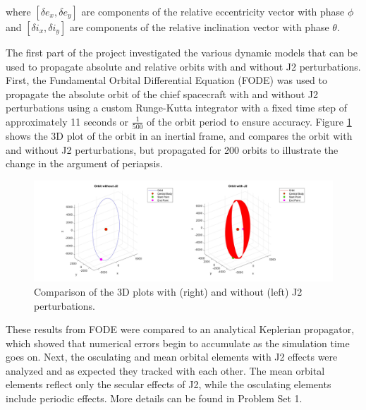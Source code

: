 where $[\delta e_x, \delta e_y]$ are components of the relative eccentricity vector with phase $\phi$ and $[\delta i_x, \delta i_y]$ are components of the relative inclination vector with phase $\theta$.

The first part of the project investigated the various dynamic models that can be used to propagate absolute and relative orbits with and without J2 perturbations. First, the Fundamental Orbital Differential Equation (FODE) was used to propagate the absolute orbit of the chief spacecraft with and without J2 perturbations using a custom Runge-Kutta integrator with a fixed time step of approximately 11 seconds or $\frac{1}{500}$ of the orbit period to ensure accuracy. Figure \ref{fig:3d_plots_with_j2} shows the 3D plot of the orbit in an inertial frame, and compares the orbit with and without J2 perturbations, but propagated for 200 orbits to illustrate the change in the argument of periapsis. 

\begin{figure}[H]
    \centering
    \includegraphics[width=1.1\linewidth]{PS1/Figures/Orbit_J2_Comparison_ECI.jpg}
    \caption{Comparison of the 3D plots with (right) and without (left) J2 perturbations. }
    \label{fig:3d_plots_with_j2}
\end{figure}

These results from FODE were compared to an analytical Keplerian propagator, which showed that numerical errors begin to accumulate as the simulation time goes on. Next, the osculating and mean orbital elements with J2 effects were analyzed and as expected they tracked with each other. The mean orbital elements reflect only the secular effects of J2, while the osculating elements include periodic effects. More details can be found in Problem Set 1.

